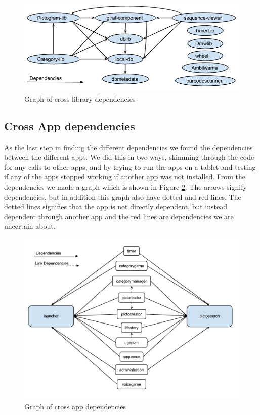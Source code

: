 \begin{figure}[H]
	\centering
	\includegraphics[width=0.8 \textwidth]{pictures/LibLibdependencies.png}
	\caption{Graph of cross library dependencies}
	\label{LibLibdependencies}
\end{figure}


\subsection{Cross App dependencies}
As the last step in finding the different dependencies we found the dependencies between the different apps. We did this in two ways, skimming through the code for any calls to other apps, and by trying to run the apps on a tablet and testing if any of the apps  stopped working if another app was not installed. From the dependencies we made a graph which is shown in Figure \ref{AppAppdependencies}. The arrows signify dependencies, but in addition this graph also have dotted and red lines. The dotted lines signifies that the app is not directly dependent, but instead dependent through another app and the red lines are dependencies we are uncertain about.

\begin{figure}[H]
	\centering
	\includegraphics[width=0.8 \textwidth]{pictures/AppAppdependencies.png}
	\caption{Graph of cross app dependencies}
	\label{AppAppdependencies}
\end{figure}